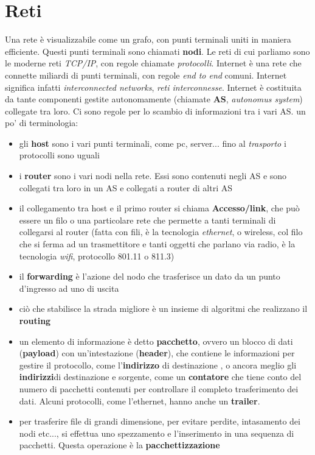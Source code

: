 \documentclass[a4paper,12pt, oneside]{book}
\begin{document}
\chapter{Reti}
Una rete è visualizzabile come un grafo, con punti terminali uniti in maniera efficiente. Questi punti terminali sono chiamati \textbf{nodi}. Le reti di cui parliamo sono le moderne reti \textit{TCP/IP}, con regole chiamate \textit{protocolli}. Internet è una rete che connette miliardi di punti terminali, con regole \textit{end to end} comuni. Internet significa infatti \textit{interconnected networks}, \textit{reti interconnesse}. Internet è costituita da tante componenti gestite autonomamente (chiamate \textbf{AS}, \textit{autonomus system}) collegate tra loro. Ci sono regole per lo scambio di informazioni tra i vari AS. un po' di terminologia:
\begin{itemize}
\item gli \textbf{host} sono i vari punti terminali, come pc, server... fino al \textit{trasporto} i protocolli sono uguali
\item i \textbf{router} sono i vari nodi nella rete. Essi sono contenuti negli AS e sono collegati tra loro in un AS e collegati a router di altri AS
\item il collegamento tra host e il primo router si chiama \textbf{Accesso/link}, che può essere un filo o una particolare rete che permette a tanti terminali di collegarsi al router (fatta con fili, è la tecnologia \textit{ethernet}, o wireless, col filo che si ferma ad un trasmettitore e tanti oggetti che parlano via radio, è la tecnologia \textit{wifi}, protocollo 801.11 o 811.3)
\item il \textbf{forwarding} è l'azione del nodo che trasferisce un dato da un punto d'ingresso ad uno di uscita 
\item ciò che stabilisce la strada migliore è un insieme di algoritmi che realizzano il \textbf{routing}
\item un elemento di informazione è detto \textbf{pacchetto}, ovvero un blocco di dati (\textbf{payload}) con un'intestazione (\textbf{header}), che contiene le informazioni per gestire il protocollo, come l'\textbf{indirizzo} di destinazione , o ancora meglio gli \textbf{indirizzi}di destinazione e sorgente, come un \textbf{contatore} che tiene conto del numero di pacchetti contenuti per controllare il completo trasferimento dei dati. Alcuni protocolli, come l'ethernet, hanno anche un \textbf{trailer}.
\item per trasferire file di grandi dimensione, per evitare perdite, intasamento dei nodi etc..., si effettua uno spezzamento e l'inserimento in una sequenza di pacchetti. Questa operazione è la \textbf{pacchettizzazione}

\end{itemize}
\end{document}
